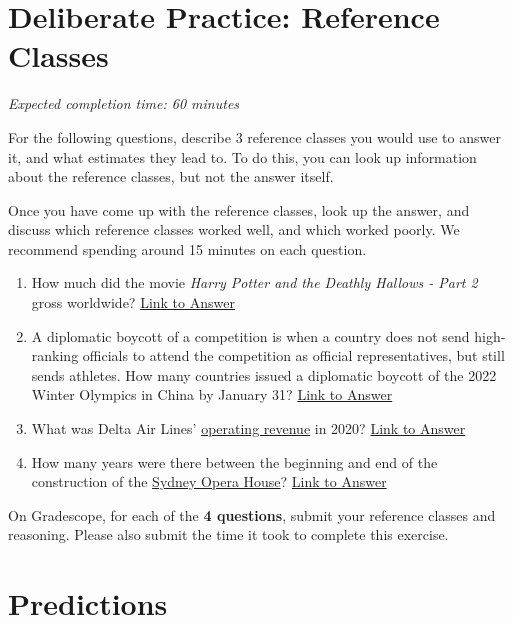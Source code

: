 \documentclass[11pt]{article}
\begin{document}
\section*{Deliberate Practice: Reference Classes}

\emph{Expected completion time: 60 minutes}

For the following questions, describe 3 reference classes you would use to answer it, and what estimates they lead to. To do this, you can look up information about the reference classes, but not the answer itself. 

Once you have come up with the reference classes, look up the answer, and discuss which reference classes worked well, and which worked poorly. We recommend spending around 15 minutes on each question.

\begin{enumerate}
	\item How much did the movie \emph{Harry Potter and the Deathly Hallows - Part 2} gross worldwide? \href{https://en.wikipedia.org/wiki/Harry_Potter_and_the_Deathly_Hallows_%E2%80%93_Part_2#Box_office}{Link to Answer}
	\item A diplomatic boycott of a competition is when a country does not send high-ranking officials to attend the competition as official representatives, but still sends athletes. How many countries issued a diplomatic boycott of the 2022 Winter Olympics in China by January 31? \href{https://en.wikipedia.org/wiki/2022_Winter_Olympics#Diplomatic_boycotts}{Link to Answer}
	\item What was Delta Air Lines' \href{https://www.investopedia.com/terms/o/operating-revenue.asp}{operating revenue} in 2020? \href{https://ir.delta.com/news/news-details/2021/Delta-Air-Lines-Announces-December-Quarter-and-Full-Year-2020-Financial-Results/default.aspx}{Link to Answer}
	\item How many years were there between the beginning and end of the construction of the \href{https://en.wikipedia.org/wiki/Sydney_Opera_House#/media/File:Sydney_Australia._(21339175489).jpg}{Sydney Opera House}? \href{https://en.wikipedia.org/wiki/Sydney_Opera_House}{Link to Answer}
	
\end{enumerate}

On Gradescope, for each of the \textbf{4 questions}, submit your reference classes and reasoning. Please also submit the time it took to complete this exercise.

\section*{Predictions}
\end{document}
